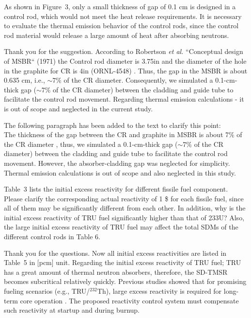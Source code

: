 \documentclass[answers,11pt]{exam}
\begin{document}
\begin{questions}
\begin{solution}
     
\end{solution}

\question As shown in Figure~3, only a small thickness of gap of 0.1 cm is designed in a control rod, which would not meet the heat release requirements. It is necessary to evaluate the thermal emission behavior of the control rods, since the control rod material would release a large amount of heat after absorbing neutrons.
\begin{solution}
	
    Thank you for the suggestion. According to Robertson \emph{et al.} ``Conceptual design of MSBR`` (1971) the Control rod diameter is 3.75in and the diameter of the hole in the graphite for CR is 4in (ORNL-4548) \cite{robertson_conceptual_1971}. Thus, the gap in the MSBR is about 0.635 cm, i.e., $\sim$7\% of the CR diameter. Consequently, we simulated a 0.1-cm-thick gap ($\sim$7\% of the CR diameter) between the cladding and guide tube to facilitate the control rod movement. Regarding thermal emission calculations - it is out of scope and neglected in the current study.
	
	The following paragraph has been added to the text to clarify this point:\\
	
	The thickness of the gap between the CR and graphite in MSBR is about 7\% of the CR diameter \cite{robertson_conceptual_1971}, thus, we simulated a 0.1-cm-thick gap ($\sim$7\% of the CR diameter) between the cladding and guide tube to facilitate the control rod movement. However, the absorber-cladding gap was neglected for simplicity. Thermal emission calculations is out of scope and also neglected in this study.
	
	
\end{solution}

\question Table~3 lists the initial excess reactivity for different fissile fuel component. Please clarify the corresponding actual reactivity of 1 \$ for each fissile fuel, since all of them may be significantly different from each other. In addition, why is the initial excess reactivity of TRU fuel significantly higher than that of 233U? Also, the large initial excess reactivity of TRU fuel may affect the total SDMs of the different control rods in Table 6.
\begin{solution}
	
	Thank you for the questions. Now all initial excess reactivities are listed in Table~5 in [pcm] unit. Regarding the initial excess reactivity of TRU fuel; TRU has a great amount of thermal neutron absorbers, therefore, the SD-TMSR becomes subcritical relatively quickly. Previous studies showed that for promising fueling scenarios (e.g., TRU/$^{232}$Th), large excess reactivity is required for long-term core operation \cite{ashraf2020Strategies,betzler2017assessment,rykhlevskii_fuel_2019}. The proposed reactivity control system must compensate such reactivity at startup and during burnup.
	

\end{solution}
\end{questions}
\end{document}
